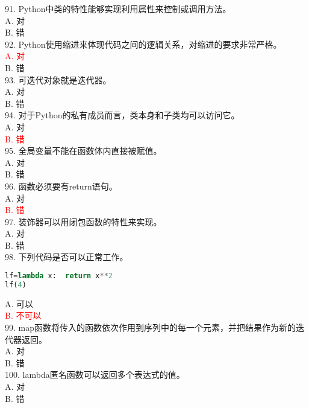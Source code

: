 \documentclass[6pt]{article}
\begin{document}
91. Python中类的特性能够实现利用属性来控制或调用方法。\\

A. 对\\
B. 错\\

92. Python使用缩进来体现代码之间的逻辑关系，对缩进的要求非常严格。\\

\textcolor{red}{A. 对}\\
B. 错\\

93. 可迭代对象就是迭代器。\\

A. 对\\
B. 错\\

94. 对于Python的私有成员而言，类本身和子类均可以访问它。\\

A. 对\\
\textcolor{red}{B. 错}\\

95. 全局变量不能在函数体内直接被赋值。\\

A. 对\\
B. 错\\

96. 函数必须要有return语句。\\

A. 对\\
\textcolor{red}{B. 错}\\

97. 装饰器可以用闭包函数的特性来实现。\\

A. 对\\
B. 错\\

98. 下列代码是否可以正常工作。\\
\begin{lstlisting}[language=Python]
lf=lambda x:  return x**2
lf(4)
\end{lstlisting}

A. 可以\\
\textcolor{red}{B. 不可以}\\

99. map函数将传入的函数依次作用到序列中的每一个元素，并把结果作为新的迭代器返回。\\

A. 对\\
B. 错\\

100. lambda匿名函数可以返回多个表达式的值。\\

A. 对\\
B. 错
\end{document}
